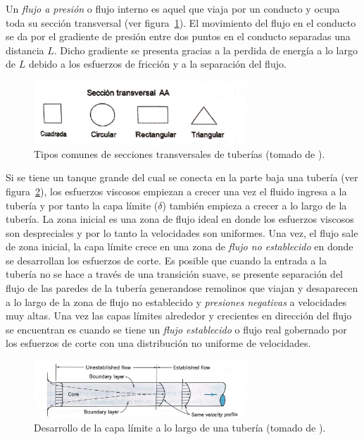 \documentclass[11pt, oneside]{article}
\begin{document}
Un \emph{flujo a presi\'on} o flujo interno es aquel que viaja por un conducto y ocupa toda su secci\'on transversal (ver figura~\ref{ttub}). El movimiento del flujo en el conducto se da por el gradiente de presi\'on entre dos puntos en el conducto separadas una distancia $L$. Dicho gradiente se presenta gracias a la perdida de energ\'ia a lo largo de $L$ debido a los esfuerzos de fricci\'on y a la separaci\'on del flujo.  

\begin{figure}[h]
\centering
\includegraphics[width=8cm]{ttub.jpeg}
\caption{Tipos comunes de secciones transversales de tuber\'ias (tomado de \cite{agudelo2011mecanica}).}
\label{ttub}
\end{figure}

Si se tiene un tanque grande del cual se conecta en la parte baja una tuber\'ia (ver figura~\ref{cali}), los esfuerzos viscosos empiezan a crecer una vez el fluido ingresa a la tuber\'ia y por tanto la capa l\'imite ($\delta$) tambi\'en empieza a crecer a lo largo de la tuber\'ia. La zona inicial es una zona de flujo ideal en donde los esfuerzos viscosos son despreciales y por lo tanto la velocidades son uniformes. Una vez, el flujo sale de zona inicial, la capa l\'imite crece en una zona de \emph{flujo no establecido} en donde se desarrollan los esfuerzos de corte. Es posible que cuando la entrada a la tuber\'ia no se hace a trav\'es de una transici\'on suave, se presente separaci\'on del flujo de las paredes de la tuber\'ia generandose remolinos que viajan y desaparecen a lo largo de la zona de flujo no establecido y \emph{presiones negativas} a velocidades muy altas. Una vez las capas l\'imites alrededor y crecientes en direcci\'on del flujo se encuentran es cuando se tiene un \emph{flujo establecido} o flujo real gobernado por los esfuerzos de corte con una distribuci\'on no uniforme de velocidades.
  
\begin{figure}[h]
\centering
\includegraphics[width=8cm]{cali.jpeg}
\caption{Desarrollo de la capa l\'imite a lo largo de una tuber\'ia (tomado de \cite{street471elementary}).}
\label{cali}
\end{figure}
\end{document}
